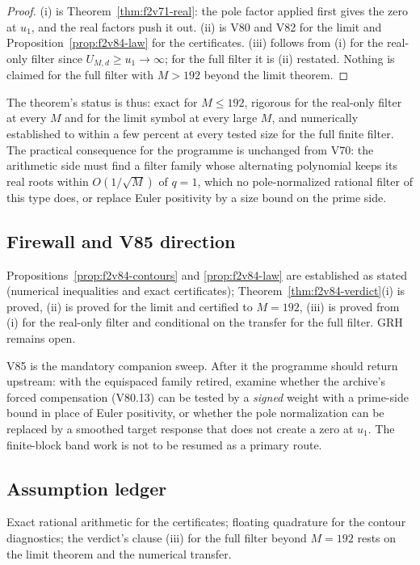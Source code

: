 \documentclass[11pt]{article}
\theoremstyle{definition}
\theoremstyle{remark}
\begin{document}
\begin{proof}
(i) is Theorem~\ref{thm:f2v71-real}: the pole factor applied first
gives the zero at \(u_1\), and the real factors push it out.  (ii) is
V80 and V82 for the limit and Proposition~\ref{prop:f2v84-law} for the
certificates.  (iii) follows from (i) for the real-only filter since
\(U_{M,d}\ge u_1\to\infty\); for the full filter it is (ii) restated.
Nothing is claimed for the full filter with \(M>192\) beyond the limit
theorem.
\end{proof}

The theorem's status is thus: exact for \(M\le192\), rigorous for the
real-only filter at every \(M\) and for the limit symbol at every large
\(M\), and numerically established to within a few percent at every
tested size for the full finite filter.
The practical consequence for the programme is unchanged from V70: the
arithmetic side must find a filter family whose alternating polynomial
keeps its real roots within \(O(1/\sqrt M)\) of \(q=1\), which no
pole-normalized rational filter of this type does, or replace Euler
positivity by a size bound on the prime side.

\subsection*{Firewall and V85 direction}
\label{fire:f2v84}
Propositions~\ref{prop:f2v84-contours} and \ref{prop:f2v84-law} are
established as stated (numerical inequalities and exact certificates);
Theorem~\ref{thm:f2v84-verdict}(i) is proved, (ii) is proved for the
limit and certified to \(M=192\), (iii) is proved from (i) for the
real-only filter and conditional on the transfer for the full filter.
GRH remains open.

V85 is the mandatory companion sweep.  After it the programme should
return upstream: with the equispaced family retired, examine whether the
archive's forced compensation (V80.13) can be tested by a
\emph{signed} weight with a prime-side bound in place of Euler
positivity, or whether the pole normalization can be replaced by a
smoothed target response that does not create a zero at \(u_1\).  The
finite-block band work is not to be resumed as a primary route.

\subsection*{Assumption ledger}
\label{ass:f2v84}
Exact rational arithmetic for the certificates; floating quadrature for
the contour diagnostics; the verdict's clause (iii) for the full filter
beyond \(M=192\) rests on the limit theorem and the numerical transfer.
\endgroup
\end{document}
